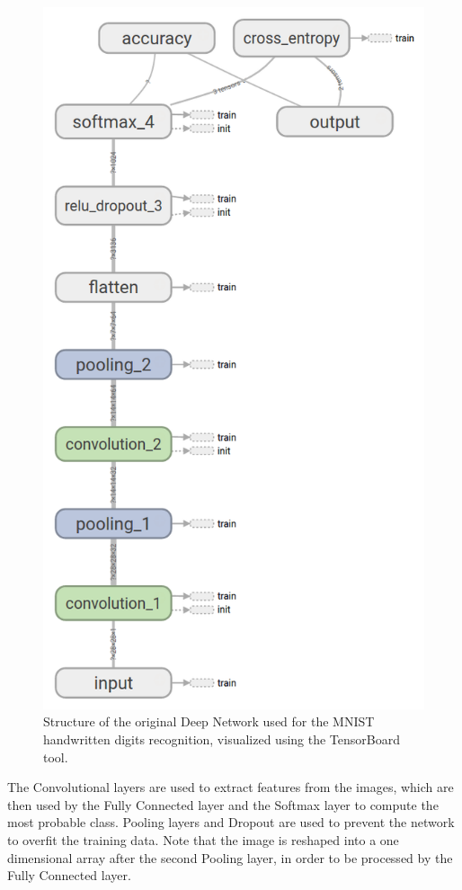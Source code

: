 \begin{figure}[t]
	\centering
	\includegraphics[width=\columnwidth]{figures/graph}
	\caption{Structure of the original Deep Network used for the MNIST handwritten digits recognition, visualized using the TensorBoard tool.}
	\label{fig:graph}
\end{figure}

The Convolutional layers are used to extract features from the images, which are then used by the Fully Connected layer and the Softmax layer to compute the most probable class.
Pooling layers and Dropout are used to prevent the network to overfit the training data.
Note that the image is reshaped into a one dimensional array after the second Pooling layer, in order to be processed by the Fully Connected layer.

